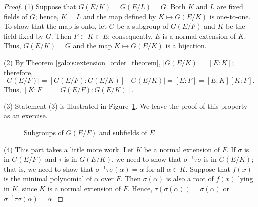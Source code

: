  
\begin{proof}
(1)
Suppose that $G(E/K) = G(E/L) = G$. Both $K$ and $L$ are fixed fields 
of $G$; hence, $K=L$ and the map defined by $K \mapsto G(E/K)$ is
one-to-one. To show that the map is onto, let $G$ be a subgroup of
$G(E/F)$ and $K$ be the field fixed by $G$. Then $F \subset K \subset
E$; consequently, $E$ is a normal extension of $K$. Thus, $G(E/K) = G$
and the map $K \mapsto G(E/K)$ is a bijection. 
 
 
(2)
By Theorem \ref{galois:extension_order_theorem}, $|G(E/K)| = [E:K]$; therefore, 
\[
|G(E/F)| = [G(E/F):G(E/K)] \cdot |G(E/K)| = [E:F] = [E:K][K:F].
\]
Thus, $[K:F] = [G(E/F):G(E/K)]$.
 
 
(3)
Statement (3) is illustrated in Figure~\ref{Galois2}.
We leave the proof of this property as an exercise.
 
\begin{figure}[htb]
\begin{center}
\end{center}
\caption{Subgroups of $G(E/F)$ and subfields of $E$} 
\label{Galois2}
\end{figure}
 
 
(4)
This part takes a little more work. Let $K$ be a normal extension of
$F$. If $\sigma$ is in $G(E/F)$ and $\tau$ is in $G(E/K)$, we need to
show that $\sigma^{-1} \tau \sigma$ is in $G(E/K)$; that is, we need
to show that $\sigma^{-1} \tau \sigma( \alpha) = \alpha$ for all
$\alpha \in K$.	Suppose that $f(x)$ is the minimal polynomial of
$\alpha$ over $F$. Then $\sigma( \alpha )$ is also a root of
$f(x)$ lying in $K$, since $K$ is a normal extension of $F$. Hence,
$\tau( \sigma( \alpha )) = \sigma( \alpha )$ or $\sigma^{-1} \tau 
\sigma( \alpha) = \alpha$.
 

\end{proof}
